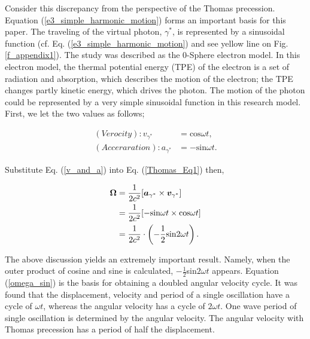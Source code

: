 \documentclass[10.5pt]{article}
\numberwithin{equation}{section}
\begin{document}
Consider this discrepancy from the perspective of the Thomas precession. Equation (\ref{e3_simple_harmonic_motion}) forms an important basis for this paper. The traveling of the virtual photon, ${\gamma^{*}}$, is represented by a sinusoidal function (cf. Eq. (\ref{e3_simple_harmonic_motion}) and see yellow line on Fig. \ref{f_appendix1}). The study was described as the 0-Sphere electron model. In this electron model, the thermal potential  energy (TPE) of the electron is a set of radiation and absorption, which describes the motion of the electron; the TPE changes partly kinetic energy, which drives the photon. The motion of the photon could be represented by a very simple sinusoidal function in this research model. First, we let the two values as follows;

    \begin{equation}
        \begin{split}
            (Verocity): v_{\gamma^{*}}
                &= \mathrm{cos}\omega t , \\
            (Acceraration): a_{\gamma^{*}}
                &= - \mathrm{sin}\omega t
                .
        \label{v_and_a}
        \end{split}
    \end{equation}

Substitute Eq. (\ref{v_and_a}) into Eq. (\ref{Thomas_Eq1}) then,

    \begin{equation}
        \begin{split}
            {\bf \Omega} 
                &= \frac{1}{2 c^2}[{\boldsymbol a_{\gamma^{*}}} \times {\boldsymbol v_{\gamma^{*}}} ]  \\
                &= \frac{1}{2 c^2} [ -\mathrm{sin}\omega t \times \mathrm{cos}\omega t ] \\
                &= \frac{1}{2 c^2} \cdot \left( - \frac{1}{2} \mathrm{sin}2\omega t \right)
                .
        \label{omega_sin}
        \end{split}
    \end{equation}


The above discussion yields an extremely important result. Namely, when the outer product of cosine and sine is calculated, $-\frac{1}{2}$sin$2\omega t$ appears. Equation (\ref{omega_sin}) is the basis for obtaining a doubled angular velocity cycle. It was found that the displacement, velocity and period of a single oscillation have a cycle of $\omega t$, whereas the angular velocity has a cycle of $2\omega t$. One wave period of single oscillation is determined by the angular velocity. The angular velocity with Thomas precession has a period of half the displacement.
\end{document}

